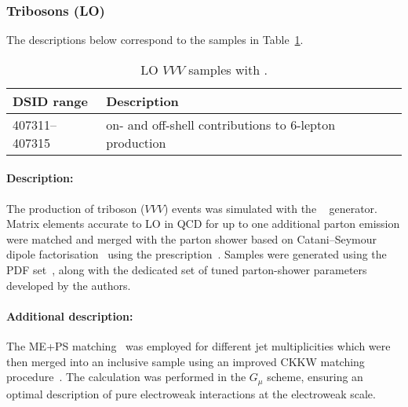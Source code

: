 


\subsubsection{Tribosons (LO)}

The descriptions below correspond to the samples in
Table~\ref{tab:MB-sherpa-vvvlo}.

\begin{table}[htbp]
  \caption{LO $VVV$ samples with \SHERPA.}%
  \label{tab:MB-sherpa-vvvlo}
  \centering
  \begin{tabular}{l l}
    \toprule
    DSID range & Description \\
    \midrule
    407311--407315   & on- and off-shell contributions to 6-lepton production\\
    \bottomrule
  \end{tabular}
\end{table}

\paragraph{Description:}

The production of triboson ($VVV$) events was simulated with the
\SHERPA[2.2.1]~\cite{Bothmann:2019yzt} generator. Matrix elements accurate to LO in QCD 
for up to one additional parton emission were matched and merged with the \SHERPA parton shower based on Catani--Seymour
dipole factorisation~\cite{Gleisberg:2008fv,Schumann:2007mg} using the \MEPSatLO
prescription~\cite{Hoeche:2011fd,Hoeche:2012yf,Catani:2001cc,Hoeche:2009rj}.
Samples were generated using the \NNPDF[3.0nnlo] PDF set~\cite{Ball:2014uwa},
along with the dedicated set of tuned parton-shower parameters
developed by the \SHERPA authors.

\paragraph{Additional description:}

The ME+PS matching~\cite{Hoeche:2011fd} was employed for different jet
multiplicities which were then merged into an inclusive sample 
using an improved CKKW matching
procedure~\cite{Catani:2001cc,Hoeche:2009rj}.  The calculation was
performed in the $G_\mu$ scheme, ensuring an optimal description
of pure electroweak interactions at the electroweak scale.


